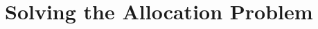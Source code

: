 \documentclass{article}
\begin{document}



\section{Solving the Allocation Problem}
\label{sec:solvingAP}
\end{document}
